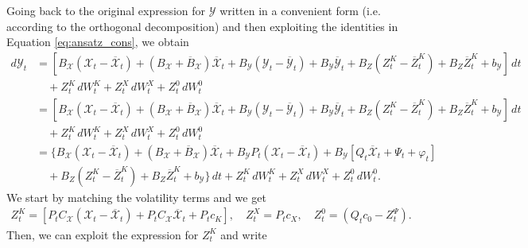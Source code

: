\documentclass[10pt,a4paper]{amsart}
\numberwithin{equation}{section}
\begin{document}
Going back to the original expression for $\mathcal{Y}$ written in a convenient form (i.e. according to the orthogonal decomposition) and then exploiting the identities in Equation \eqref{eq:ansatz_cons}, we obtain
\begin{align*}
    d{\mathcal{Y}}_t 
    & = [B_{\mathcal{X}} ({\mathcal{X}}_t - \overline{{\mathcal{X}}}_t) + (B_{\mathcal{X}}+\overline{B}_{\mathcal{X}}) \overline{{\mathcal{X}}}_t + B_{\mathcal{Y}} ({\mathcal{Y}}_t - \overline{\mathcal{Y}}_t) + B_{\mathcal{Y}}  \overline{\mathcal{Y}}_t + B_Z ({Z}^K_t-\overline{Z}^K_t) + B_Z \overline{Z}^K_t + b_\mathcal{Y}]\,dt \\
    & \quad + {Z}^K_t\,d{W}_t^{K} + {Z}^X_t\,dW_t^{X}+ {Z}^0_t\,dW_t^{0}\\
    & = [B_{\mathcal{X}} ({\mathcal{X}}_t - \overline{{\mathcal{X}}}_t) + (B_{\mathcal{X}}+\overline{B}_{\mathcal{X}}) \overline{{\mathcal{X}}}_t + B_{\mathcal{Y}} ({\mathcal{Y}}_t - \overline{\mathcal{Y}}_t) + B_{\mathcal{Y}}  \overline{\mathcal{Y}}_t + B_Z ({Z}^K_t-\overline{Z}^K_t) + B_Z \overline{Z}^K_t + b_\mathcal{Y}]\,dt \\
    & \quad + {Z}^K_t\,d{W}_t^{K} + {Z}^X_t\,dW_t^{X}+ {Z}^0_t\,dW_t^{0}\\
    & = \Big\{B_{\mathcal{X}} ({\mathcal{X}}_t - \overline{{\mathcal{X}}}_t) + (B_{\mathcal{X}}+\overline{B}_{\mathcal{X}}) \overline{{\mathcal{X}}}_t + B_{\mathcal{Y}} {P}_t({\mathcal{X}}_t - \overline{{\mathcal{X}}}_t) + B_{\mathcal{Y}}  [Q_t \overline{{\mathcal{X}}}_t + \Psi_t + \varphi_t] \\
    & \quad + B_Z ({Z}^K_t-\overline{Z}^K_t) + B_Z \overline{Z}^K_t + b_\mathcal{Y}\Big\}\,dt + {Z}^K_t\,d{W}_t^{K} + {Z}^X_t\,dW_t^{X}+ {Z}^0_t\,dW_t^{0}.
\end{align*}
We start by matching the volatility terms and we get
\begin{align}
    {Z}^K_t = \left[{P}_t C_{\mathcal{X}}({\mathcal{X}}_t - \overline{{\mathcal{X}}}_t) + {P}_t C_{\mathcal{X}} \overline{{\mathcal{X}}}_t +P_tc_K\right],
    \quad
    {Z}^X_t = P_tc_X,
    \quad
    {Z}^0_t = (Q_t c_{0}-Z^\Psi_t).
\end{align}
Then, we can exploit the expression for  ${Z}^K_t$ and write
\end{document}
